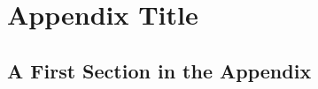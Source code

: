 \chapter{Appendix Title}
\label{ch: Appendix Title}

\section{A First Section in the Appendix}
\label{sec: A First Section in the Appendix}

\lipsum[30]